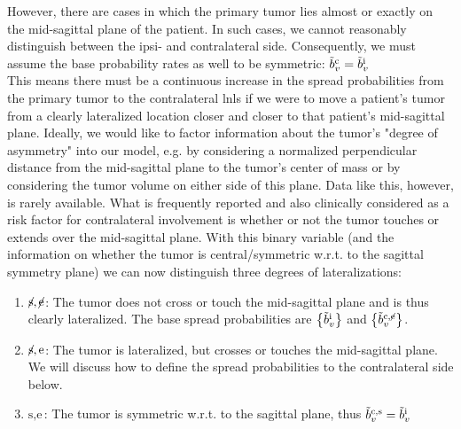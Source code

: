 \documentclass[\relativeRoot/main.tex]{subfiles}
\begin{document}
However, there are cases in which the primary tumor lies almost or exactly on the mid-sagittal plane of the patient. In such cases, we cannot reasonably distinguish between the ipsi- and contralateral side. Consequently, we must assume the base probability rates as well to be symmetric: $\Tilde{b}^\text{c}_v = \Tilde{b}^\text{i}_v$ \\
This means there must be a continuous increase in the spread probabilities from the primary tumor to the contralateral \glspl{lnl} if we were to move a patient's tumor from a clearly lateralized location closer and closer to that patient's mid-sagittal plane. Ideally, we would like to factor information about the tumor's "degree of asymmetry" into our model, e.g. by considering a normalized perpendicular distance from the mid-sagittal plane to the tumor's center of mass or by considering the tumor volume on either side of this plane. Data like this, however, is rarely available. What is frequently reported and also clinically considered as a risk factor for contralateral involvement is whether or not the tumor touches or extends over the mid-sagittal plane. With this binary variable (and the information on whether the tumor is central/symmetric w.r.t. to the sagittal symmetry plane) we can now distinguish three degrees of lateralizations:

\begin{enumerate}
    \item $\centernot{\text{s}} , \centernot{\text{e}}$: The tumor does not cross or touch the mid-sagittal plane and is thus clearly lateralized. The base spread probabilities are $\big\{ \Tilde{b}_v^\text{i} \big\}$ and $\big\{ \Tilde{b}_v^{\text{c},\centernot{\text{e}}} \big\}$.
    \item $\centernot{\text{s}} , \text{e}$: The tumor is lateralized, but crosses or touches the mid-sagittal plane. We will discuss how to define the spread probabilities to the contralateral side below.
    \item $\text{s} , \text{e}$: The tumor is symmetric w.r.t. to the sagittal plane, thus $\Tilde{b}_v^{\text{c},\text{s}} = \Tilde{b}_v^\text{i}$
\end{enumerate}
\end{document}
